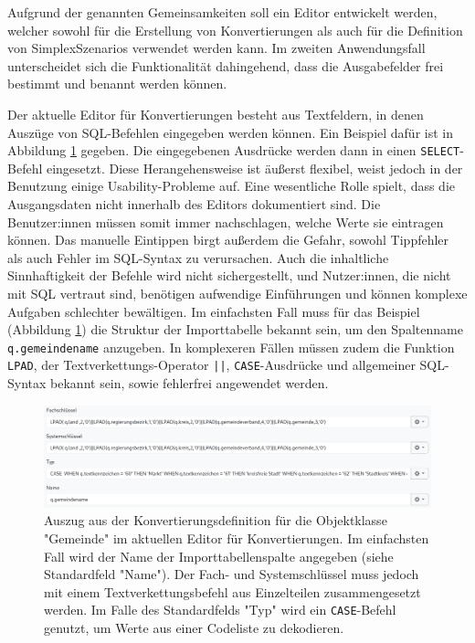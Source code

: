 \pskip
Aufgrund der genannten Gemeinsamkeiten soll ein Editor entwickelt werden, welcher sowohl für die Erstellung von Konvertierungen als auch für die Definition von SimplexSzenarios verwendet werden kann. Im zweiten Anwendungsfall unterscheidet sich die Funktionalität dahingehend, dass die Ausgabefelder frei bestimmt und benannt werden können.

\pskip
Der aktuelle Editor für Konvertierungen besteht aus Textfeldern, in denen Auszüge von \ac{SQL}-Befehlen eingegeben werden können. Ein Beispiel dafür ist in Abbildung \ref{fig:conversion-gemeinde} gegeben. Die eingegebenen Ausdrücke werden dann in einen \texttt{SELECT}-Befehl eingesetzt. Diese Herangehensweise ist äußerst flexibel, weist jedoch in der Benutzung einige Usability-Probleme auf. Eine wesentliche Rolle spielt, dass die Ausgangsdaten nicht innerhalb des Editors dokumentiert sind. Die Benutzer:innen müssen somit immer nachschlagen, welche Werte sie eintragen können. Das manuelle Eintippen birgt außerdem die Gefahr, sowohl Tippfehler als auch Fehler im \ac{SQL}-Syntax zu verursachen. Auch die inhaltliche Sinnhaftigkeit der Befehle wird nicht sichergestellt, und Nutzer:innen, die nicht mit SQL vertraut sind, benötigen aufwendige Einführungen und können komplexe Aufgaben schlechter bewältigen. Im einfachsten Fall muss für das Beispiel (Abbildung \ref{fig:conversion-gemeinde}) die Struktur der Importtabelle bekannt sein, um den Spaltenname \texttt{q.gemeindename} anzugeben. In komplexeren Fällen müssen zudem die Funktion \texttt{LPAD}, der Textverkettungs-Operator \texttt{||}, \texttt{CASE}-Ausdrücke und allgemeiner \ac{SQL}-Syntax bekannt sein, sowie fehlerfrei angewendet werden.

\begin{figure}[ht]
  \centering
  \includegraphics[width=.95\textwidth]{assets/conversion-gemeinde.png}
  \caption[Auszug einer Konvertierungsdefinition im aktuellen Editor]{Auszug aus der Konvertierungsdefinition für die Objektklasse "Gemeinde" im aktuellen Editor für Konvertierungen. Im einfachsten Fall wird der Name der Importtabellenspalte angegeben (siehe Standardfeld "Name"). Der Fach- und Systemschlüssel muss jedoch mit einem Textverkettungsbefehl aus Einzelteilen zusammengesetzt werden. Im Falle des Standardfelds "Typ" wird ein \texttt{CASE}-Befehl genutzt, um Werte aus einer Codeliste zu dekodieren.}
  \label{fig:conversion-gemeinde}
\end{figure}

